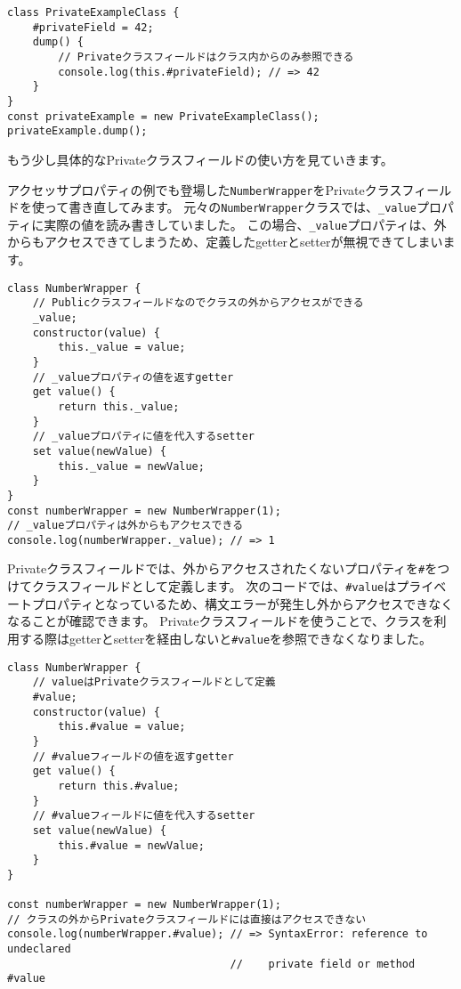 \begin{lstlisting}
class PrivateExampleClass {
    #privateField = 42;
    dump() {
        // Privateクラスフィールドはクラス内からのみ参照できる
        console.log(this.#privateField); // => 42
    }
}
const privateExample = new PrivateExampleClass();
privateExample.dump();
\end{lstlisting}

もう少し具体的なPrivateクラスフィールドの使い方を見ていきます。

アクセッサプロパティの例でも登場した\texttt{NumberWrapper}をPrivateクラスフィールドを使って書き直してみます。
元々の\texttt{NumberWrapper}クラスでは、\texttt{\_value}プロパティに実際の値を読み書きしていました。
この場合、\texttt{\_value}プロパティは、外からもアクセスできてしまうため、定義したgetterとsetterが無視できてしまいます。

\begin{lstlisting}
class NumberWrapper {
    // Publicクラスフィールドなのでクラスの外からアクセスができる
    _value;
    constructor(value) {
        this._value = value;
    }
    // _valueプロパティの値を返すgetter
    get value() {
        return this._value;
    }
    // _valueプロパティに値を代入するsetter
    set value(newValue) {
        this._value = newValue;
    }
}
const numberWrapper = new NumberWrapper(1);
// _valueプロパティは外からもアクセスできる
console.log(numberWrapper._value); // => 1
\end{lstlisting}

Privateクラスフィールドでは、外からアクセスされたくないプロパティを\texttt{\#}をつけてクラスフィールドとして定義します。
次のコードでは、\texttt{\#value}はプライベートプロパティとなっているため、構文エラーが発生し外からアクセスできなくなることが確認できます。
Privateクラスフィールドを使うことで、クラスを利用する際はgetterとsetterを経由しないと\texttt{\#value}を参照できなくなりました。

\begin{lstlisting}
class NumberWrapper {
    // valueはPrivateクラスフィールドとして定義
    #value;
    constructor(value) {
        this.#value = value;
    }
    // #valueフィールドの値を返すgetter
    get value() {
        return this.#value;
    }
    // #valueフィールドに値を代入するsetter
    set value(newValue) {
        this.#value = newValue;
    }
}

const numberWrapper = new NumberWrapper(1);
// クラスの外からPrivateクラスフィールドには直接はアクセスできない
console.log(numberWrapper.#value); // => SyntaxError: reference to undeclared 
                                   //    private field or method #value
\end{lstlisting}

